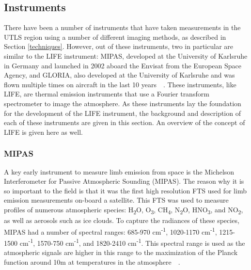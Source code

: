 \subsection{Instruments} \label{instruments} %
There have been a number of instruments that have taken measurements in the UTLS region using a number of different imaging methods, as described in Section \ref{techniques}. However, out of these instruments, two in particular are similar to the LIFE instrument: MIPAS, developed at the University of Karlsruhe in Germany and launched in 2002 aboard the Envisat from the European Space Agency, and GLORIA, also developed at the University of Karlsruhe and was flown multiple times on aircraft in the last 10 years~\citep{MIPAS_instrument}~\citep{GLORIA_concept}. These instruments, like LIFE, are thermal emission instruments that use a Fourier transform spectrometer to image the atmosphere. As these instruments lay the foundation for the development of the LIFE instrument, the background and description of each of these instruments are given in this section. An overview of the concept of LIFE is given here as well.

\subsubsection{MIPAS}
A key early instrument to measure limb emission from space is the Michelson Interferometer for Passive Atmospheric Sounding (MIPAS). The reason why it is so important to the field is that it was the first high resolution FTS used for limb emission measurements on-board a satellite. This FTS was used to measure profiles of numerous atmospheric species: H\textsubscript{2}O, O\textsubscript{3}, CH\textsubscript{4}, N\textsubscript{2}O, HNO\textsubscript{3}, and NO\textsubscript{2}, as well as aerosols such as ice clouds. To capture the radiances of these species, MIPAS had a number of spectral ranges: 685-970 cm\textsuperscript{-1}, 1020-1170 cm\textsuperscript{-1}, 1215-1500 cm\textsuperscript{-1}, 1570-750 cm\textsuperscript{-1}, and 1820-2410 cm\textsuperscript{-1}. This spectral range is used as the atmospheric signals are higher in this range to the maximization of the Planck function around 10\textmu m at temperatures in the atmosphere~\citep{MIPAS_instrument}~\citep{MIPAS_conference}.

